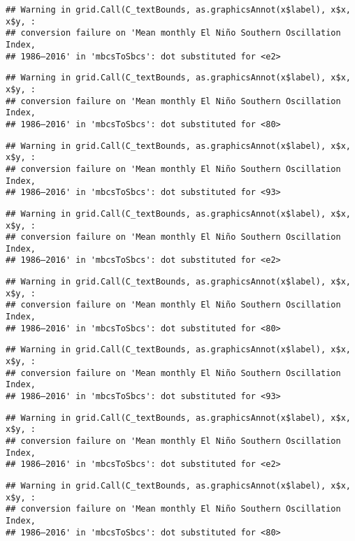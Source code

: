 \documentclass[]{article}
\theoremstyle{definition}
\theoremstyle{definition}
\theoremstyle{definition}
\theoremstyle{remark}
\begin{document}
\begin{verbatim}
## Warning in grid.Call(C_textBounds, as.graphicsAnnot(x$label), x$x, x$y, :
## conversion failure on 'Mean monthly El Niño Southern Oscillation Index,
## 1986–2016' in 'mbcsToSbcs': dot substituted for <e2>
\end{verbatim}

\begin{verbatim}
## Warning in grid.Call(C_textBounds, as.graphicsAnnot(x$label), x$x, x$y, :
## conversion failure on 'Mean monthly El Niño Southern Oscillation Index,
## 1986–2016' in 'mbcsToSbcs': dot substituted for <80>
\end{verbatim}

\begin{verbatim}
## Warning in grid.Call(C_textBounds, as.graphicsAnnot(x$label), x$x, x$y, :
## conversion failure on 'Mean monthly El Niño Southern Oscillation Index,
## 1986–2016' in 'mbcsToSbcs': dot substituted for <93>
\end{verbatim}

\begin{verbatim}
## Warning in grid.Call(C_textBounds, as.graphicsAnnot(x$label), x$x, x$y, :
## conversion failure on 'Mean monthly El Niño Southern Oscillation Index,
## 1986–2016' in 'mbcsToSbcs': dot substituted for <e2>
\end{verbatim}

\begin{verbatim}
## Warning in grid.Call(C_textBounds, as.graphicsAnnot(x$label), x$x, x$y, :
## conversion failure on 'Mean monthly El Niño Southern Oscillation Index,
## 1986–2016' in 'mbcsToSbcs': dot substituted for <80>
\end{verbatim}

\begin{verbatim}
## Warning in grid.Call(C_textBounds, as.graphicsAnnot(x$label), x$x, x$y, :
## conversion failure on 'Mean monthly El Niño Southern Oscillation Index,
## 1986–2016' in 'mbcsToSbcs': dot substituted for <93>
\end{verbatim}

\begin{verbatim}
## Warning in grid.Call(C_textBounds, as.graphicsAnnot(x$label), x$x, x$y, :
## conversion failure on 'Mean monthly El Niño Southern Oscillation Index,
## 1986–2016' in 'mbcsToSbcs': dot substituted for <e2>
\end{verbatim}

\begin{verbatim}
## Warning in grid.Call(C_textBounds, as.graphicsAnnot(x$label), x$x, x$y, :
## conversion failure on 'Mean monthly El Niño Southern Oscillation Index,
## 1986–2016' in 'mbcsToSbcs': dot substituted for <80>
\end{verbatim}
\end{document}
